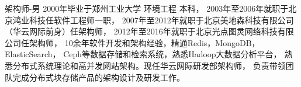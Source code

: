 架构师-男 2000年毕业于郑州工业大学 环境工程 本科，
2003年至2006年就职于北京鸿业科技任软件工程师一职，
2007年至2012年就职于北京美地森科技有限公司（华云网际前身）任架构师，
2012年至2016年就职于北京光点图灵网络科技有限公司任架构师，
10余年软件开发和架构经验，精通Redis，MongoDB，ElasticSearch，
Ceph等数据存储和检索系统，熟悉Hadoop大数据分析平台，
熟悉分布式系统理论和高并发网站架构。现任华云网际研发部架构师，
负责带领团队完成分布式块存储产品的架构设计及研发工作。
